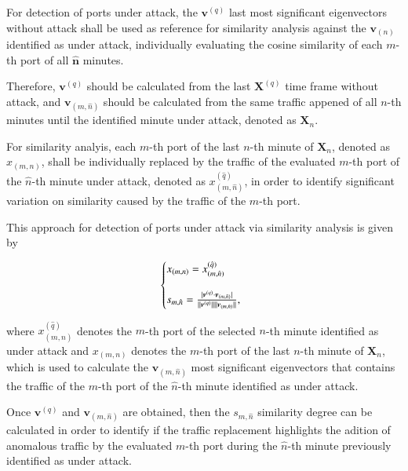 \documentclass[review]{elsarticle}
\DeclarePairedDelimiter\abs{\lvert}{\rvert}%
\DeclarePairedDelimiter\norm{\lVert}{\rVert}%
\begin{document}
For detection of ports under attack, the $\boldsymbol{v}^{(q)}$ last most significant eigenvectors without attack shall be used as reference for similarity analysis against the $\boldsymbol{v}_{(n)}$ identified as under attack, individually evaluating the cosine similarity of each $m$-th port of all $\boldsymbol{\hat{n}}$ minutes.

Therefore, $\boldsymbol{v}^{(q)}$ should be calculated from the last $\boldsymbol{X}^{(q)}$ time frame without attack, and $\boldsymbol{v}_{(m,\hat{n})}$ should be calculated from the same traffic appened of all $n$-th minutes until the identified minute under attack, denoted as $\boldsymbol{X}_n$. 

For similarity analyis, each $m$-th port of the last $n$-th minute of $\boldsymbol{X}_n$, denoted as $x_{(m,n)}$, shall be individually replaced by the traffic of the evaluated $m$-th port of the $\hat{n}$-th minute under attack, denoted as $x^{(\hat{q})}_{(m,\hat{n})}$, in order to identify significant variation on similarity caused by the traffic of the $m$-th port. 

This approach for detection of ports under attack via similarity analysis is given by

\begin{equation}\label{eq:eq15}
  \left\{
  \begin{array}{@{}ll@{}}
    x_{(m,n)} = x^{(\hat{q})}_{(m,\hat{n})} \\
    \\
    s_{m,\hat{n}} = \frac{\abs{\boldsymbol{v}^{(q)} \cdot \boldsymbol{v}_{(m,\hat{n})}}}{\norm{\boldsymbol{v}^{(q)}}\norm{\boldsymbol{v}_{(m,\hat{n})}}},
  \end{array}\right.
\end{equation}

where $x^{(\hat{q})}_{(m,\hat{n})}$ denotes the $m$-th port of the selected $n$-th minute identified as under attack and $x_{(m,n)}$ denotes the $m$-th port of the last $n$-th minute of $\boldsymbol{X}_n$, which is used to calculate the $\boldsymbol{v}_{(m,\hat{n})}$ most significant eigenvectors that contains the traffic of the $m$-th port of the $\hat{n}$-th minute identified as under attack.

Once $\boldsymbol{v}^{(q)}$ and $\boldsymbol{v}_{(m,\hat{n})}$ are obtained, then the $s_{m,\hat{n}}$ similarity degree can be calculated in order to identify if the traffic replacement highlights the adition of anomalous traffic by the evaluated $m$-th port during the $\hat{n}$-th minute previously identified as under attack. 
\end{document}
